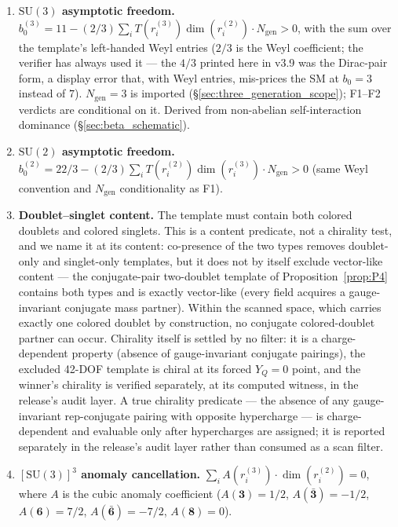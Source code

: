 \documentclass[11pt]{article}
\theoremstyle{definition}
\newcommand{\SU}{\mathrm{SU}}
\begin{document}
\begin{enumerate}[label=\textbf{F\arabic*},nosep,leftmargin=3em]
  \item \textbf{$\SU(3)$ asymptotic freedom.}\quad
  $b_0^{(3)} = 11 - (2/3) \sum_i T(r_i^{(3)}) \dim(r_i^{(2)}) \cdot N_{\mathrm{gen}} > 0$,
  with the sum over the template's left-handed Weyl entries ($2/3$ is
  the Weyl coefficient; the verifier has always used it --- the $4/3$
  printed here in v3.9 was the Dirac-pair form, a display error that,
  with Weyl entries, mis-prices the SM at $b_0 = 3$ instead of $7$).
  $N_{\mathrm{gen}} = 3$ is imported (\S\ref{sec:three_generation_scope});
  F1--F2 verdicts are conditional on it.
  Derived from non-abelian self-interaction dominance (\S\ref{sec:beta_schematic}).

  \item \textbf{$\SU(2)$ asymptotic freedom.}\quad
  $b_0^{(2)} = 22/3 - (2/3) \sum_i T(r_i^{(2)}) \dim(r_i^{(3)}) \cdot N_{\mathrm{gen}} > 0$
  (same Weyl convention and $N_{\mathrm{gen}}$ conditionality as F1).

  \item \textbf{Doublet--singlet content.}\quad
  The template must contain both colored doublets and colored
  singlets.  This is a content predicate, not a chirality test, and
  we name it at its content: co-presence of the two types removes
  doublet-only and singlet-only templates, but it does not by itself
  exclude vector-like content --- the conjugate-pair two-doublet
  template of Proposition~\ref{prop:P4} contains both types and is
  exactly vector-like (every field acquires a gauge-invariant
  conjugate mass partner).  Within the scanned space, which carries
  exactly one colored doublet by construction, no conjugate
  colored-doublet partner can occur.  Chirality itself is settled by
  no filter: it is a charge-dependent property (absence of
  gauge-invariant conjugate pairings), the excluded 42-DOF template is
  chiral at its forced $Y_Q = 0$ point, and the winner's chirality is
  verified separately, at its computed witness, in the release's audit
  layer.  A true chirality predicate ---
  the absence of any gauge-invariant rep-conjugate pairing with
  opposite hypercharge --- is charge-dependent and evaluable only
  after hypercharges are assigned; it is reported separately in the
  release's audit layer rather than consumed as a scan filter.

  \item \textbf{$[\SU(3)]^3$ anomaly cancellation.}\quad
  $\sum_i A(r_i^{(3)}) \cdot \dim(r_i^{(2)}) = 0$, where $A$ is the
  cubic anomaly coefficient ($A(\mathbf{3}) = 1/2$,
  $A(\bar{\mathbf{3}}) = -1/2$, $A(\mathbf{6}) = 7/2$,
  $A(\bar{\mathbf{6}}) = -7/2$, $A(\mathbf{8}) = 0$).


\end{enumerate}
\end{document}
